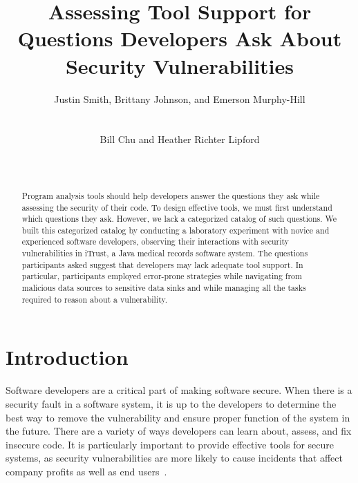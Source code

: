 \documentclass{acm_proc_article-sp}
\newcommand{\blind}[1]{#1}
\begin{document}
\title{Assessing Tool Support for Questions Developers Ask About Security Vulnerabilities}

\author{
\alignauthor Justin Smith, Brittany Johnson, and Emerson Murphy-Hill\\
\\
 \\
\email{}
\alignauthor Bill Chu and Heather Richter Lipford\\
\\
\\
\email{}
}

\maketitle


\begin{abstract}

Program analysis tools should help developers answer the questions they ask while assessing the security of their code. 
To design effective tools, we must first understand which questions they ask.
However, we lack a categorized catalog of such questions. 
We built this categorized catalog by conducting a laboratory experiment with novice and experienced software developers, observing their interactions with security vulnerabilities in iTrust, a Java medical records software system.
The questions participants asked suggest that developers may lack adequate tool support.
In particular, participants employed error-prone strategies while navigating from malicious data sources to sensitive data sinks and while managing all the tasks required to reason about a vulnerability. 

\end{abstract}


\section{Introduction}

Software developers are a critical part of making software secure. 
When there is a security fault in a software system, it is up to the developers to determine the best way to remove the vulnerability and ensure proper function of the system in the future.
There are a variety of ways developers can learn about, assess, and fix insecure code.
It is particularly important to provide effective tools for secure systems, as security vulnerabilities are more likely to cause incidents that affect company profits as well as end users~\cite{chen2002mops}. 
\end{document}

